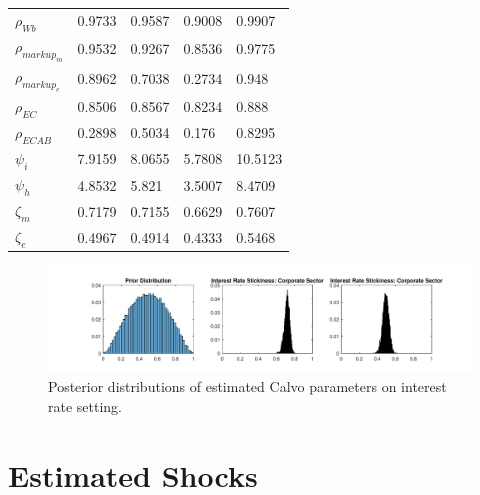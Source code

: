 \documentclass[12pt]{article}
\numberwithin{equation}{section}
\begin{document}
\begin{table}[H]
\begin{tabular}{l||llll}
$\rho_{Wb}$ & 0.9733 & 0.9587 & 0.9008 & 0.9907 \\
$\rho_{markup_m}$ & 0.9532 & 0.9267 & 0.8536 & 0.9775 \\
$\rho_{markup_e}$ & 0.8962 & 0.7038 & 0.2734 & 0.948 \\
$\rho_{EC}$ & 0.8506 & 0.8567 & 0.8234 & 0.888 \\
$\rho_{ECAB}$ & 0.2898 & 0.5034 & 0.176 & 0.8295 \\
\hline
$\psi_i$ & 7.9159 & 8.0655 & 5.7808 & 10.5123 \\
$\psi_h$ & 4.8532 & 5.821 & 3.5007 & 8.4709 \\
$\zeta_m$ & 0.7179 & 0.7155 & 0.6629 & 0.7607 \\
$\zeta_e$ & 0.4967 & 0.4914 & 0.4333 & 0.5468 \\
\end{tabular}
\end{table}





\begin{figure}[H]
\centering
\caption{Posterior distributions of estimated Calvo parameters on interest rate setting.}
\includegraphics[scale=0.65]{posteriordistributions_calvo2.pdf}
\end{figure}

\FloatBarrier

\section*{Estimated Shocks}
\end{document}
